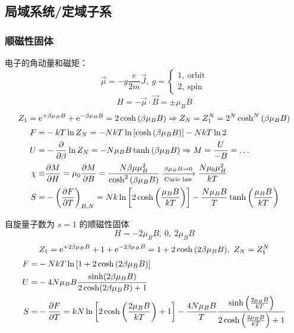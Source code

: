 \subsection{局域系统/定域子系}

\subsubsection{顺磁性固体}

电子的角动量和磁矩：\[
\vec{\mu} = - g \frac{e}{2 m} \vec{J},\ g = \begin{cases}
    1,\ \text{orbit}\\
    2,\ \text{spin}
\end{cases}\] \[
H = - \vec{\mu} \cdot \vec{B} = \pm \mu_B B
\] \[
Z_1 = \mathrm{e}^{+ \beta \mu_{B} B} + \mathrm{e}^{- \beta \mu_{B} B} = 2 \cosh \qty(\beta \mu_B B) \Rightarrow Z_N = Z_1^N = 2^N \cosh^N \qty(\beta \mu_B B)
\] \begin{align*}
    F = & - k T \ln{Z_N} = - N k T \ln \qty[\cosh \qty(\beta \mu_B B)] - N k T \ln{2}\\
    U = & - \pdv{\beta} \ln{Z_N} = - N \mu_B B \tanh \qty(\beta \mu_B B) \Rightarrow M = \frac{U}{- B} = \dots\\
    \chi \equiv & \pdv{M}{H} = \mu_0 \pdv{M}{B} = \frac{N \beta \mu \mu_B^2}{\cosh^2 \qty(\beta \mu_B B)} \xrightarrow[\text{Curie law}]{\beta \mu_B B \to 0} \frac{N \mu_0 \mu_B^2}{k T}\\
    S = & - \qty(\pdv{F}{T})_{B, N} = N k \ln \qty[2 \cosh \qty(\frac{\mu_B B}{k T})] - \frac{N \mu_B B}{T} \tanh \qty(\frac{\mu_B B}{k T})
\end{align*}

\begin{framed}
自旋量子数为 $s = 1$ 的顺磁性固体 \[
H = - 2 \mu_B B,\ 0,\ 2 \mu_B B
\] \[
Z_1 = \mathrm{e}^{+ 2 \beta \mu_B B} + 1 + \mathrm{e}^{- 2 \beta \mu_B B} = 1 + 2 \cosh \qty(2 \beta \mu_B B),\ Z_N = Z_1^N
\] \begin{align*}
F = & - N k T \ln \qty[1 + 2 \cosh \qty(2 \beta \mu_B B)]\\
U = & - 4 N \mu_B B \frac{\sinh (2 \beta \mu_B B )}{2 \cosh (2 \beta \mu_B B)+1}\\
S = & - \pdv{F}{T} = k N \ln \left[2 \cosh \left(\frac{2 \mu_B B}{k T}\right)+1\right] - \frac{4 N \mu_B B}{T} \frac{\sinh \left(\frac{2 \mu_B B}{k T}\right)}{2 \cosh \left(\frac{2 \mu_B B}{k T}\right)+1}
\end{align*}
\end{framed}

